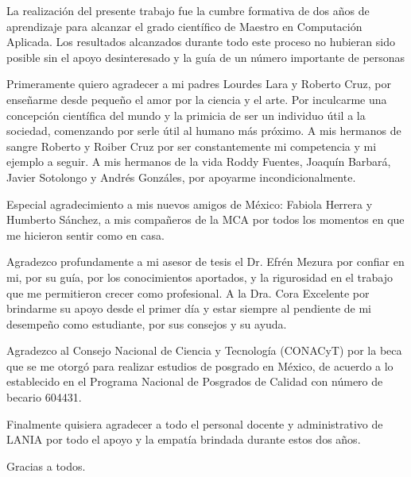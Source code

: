 \documentclass[
12pt, %
spanish, %
singlespacing, %
headsepline, %
]{MastersDoctoralThesis} %
\theoremstyle{plain}
\theoremstyle{definition}
\begin{document}
\begin{acknowledgements}
\addchaptertocentry{\acknowledgementname} %
La realización del presente trabajo fue la cumbre formativa de dos años de aprendizaje para alcanzar el grado científico de Maestro en Computación Aplicada. Los resultados alcanzados durante todo este proceso no hubieran sido posible sin el apoyo desinteresado y la guía de un número importante de personas 

Primeramente quiero agradecer a mi padres Lourdes Lara y Roberto Cruz, por enseñarme desde pequeño el amor por la ciencia y el arte. Por inculcarme una concepción científica del mundo y la primicia de ser un individuo útil a la sociedad, comenzando por serle útil al humano más próximo. A mis hermanos de sangre Roberto y Roiber Cruz por ser constantemente mi competencia y mi ejemplo a seguir. A mis hermanos de la vida Roddy Fuentes, Joaquín Barbará, Javier Sotolongo y  Andrés Gonzáles, por apoyarme incondicionalmente.

Especial agradecimiento a mis nuevos amigos de México: Fabiola Herrera y Humberto Sánchez, a mis compañeros de la MCA por todos los momentos en que me hicieron sentir como en casa.

Agradezco profundamente a mi asesor de tesis el Dr. Efrén Mezura por confiar en mi, por su guía, por los conocimientos aportados, y la rigurosidad en el trabajo que me permitieron crecer como profesional. A la Dra. Cora Excelente por brindarme su apoyo desde el primer día y estar siempre al pendiente de mi desempeño como estudiante, por sus consejos y su ayuda.

Agradezco al Consejo Nacional de Ciencia y Tecnología (CONACyT) por la beca que se me otorgó  para realizar estudios de posgrado en México, de acuerdo a lo establecido en el Programa Nacional de Posgrados de Calidad con número de becario 604431.

Finalmente quisiera agradecer a todo el personal docente y administrativo de LANIA por todo el apoyo y la empatía brindada durante estos dos años.

Gracias a todos.  

\end{acknowledgements}


\end{document}
